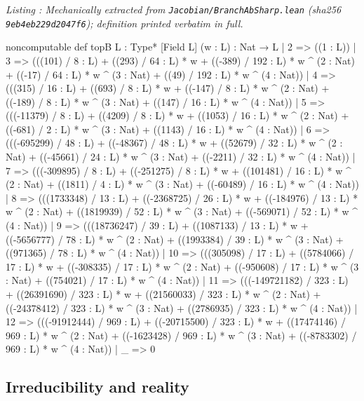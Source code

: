 \documentclass[a4paper,11pt]{article}
\newcounter{leanlisting}
\newenvironment{leanlisting}[2]{%
  \refstepcounter{leanlisting}\label{#2}%
  \begin{center}\textit{\small Listing \theleanlisting: #1}\end{center}%
  \Verbatim[breaklines=true,breakanywhere=true,fontsize=\footnotesize,frame=single,framesep=4pt,rulecolor=\color{gray!50},fillcolor=\color{gray!5}]%
}{%
  \endVerbatim%
}
\theoremstyle{plain}
\theoremstyle{definition}
\theoremstyle{remark}
\begin{document}
\begin{leanlisting}{Mechanically extracted from \texttt{Jacobian/BranchAbSharp.lean} (sha256 \texttt{9eb4eb229d2047f6}); definition printed verbatim in full.}{ab:lst:def-topb}
noncomputable def topB {L : Type*} [Field L] (w : L) : Nat → L
  | 2 => ((1 : L))
  | 3 => (((101) / 8 : L) + ((293) / 64 : L) * w + ((-389) / 192 : L) * w ^ (2 : Nat) + ((-17) / 64 : L) * w ^ (3 : Nat) + ((49) / 192 : L) * w ^ (4 : Nat))
  | 4 => (((315) / 16 : L) + ((693) / 8 : L) * w + ((-147) / 8 : L) * w ^ (2 : Nat) + ((-189) / 8 : L) * w ^ (3 : Nat) + ((147) / 16 : L) * w ^ (4 : Nat))
  | 5 => (((-11379) / 8 : L) + ((4209) / 8 : L) * w + ((1053) / 16 : L) * w ^ (2 : Nat) + ((-681) / 2 : L) * w ^ (3 : Nat) + ((1143) / 16 : L) * w ^ (4 : Nat))
  | 6 => (((-695299) / 48 : L) + ((-48367) / 48 : L) * w + ((52679) / 32 : L) * w ^ (2 : Nat) + ((-45661) / 24 : L) * w ^ (3 : Nat) + ((-2211) / 32 : L) * w ^ (4 : Nat))
  | 7 => (((-309895) / 8 : L) + ((-251275) / 8 : L) * w + ((101481) / 16 : L) * w ^ (2 : Nat) + ((1811) / 4 : L) * w ^ (3 : Nat) + ((-60489) / 16 : L) * w ^ (4 : Nat))
  | 8 => (((1733348) / 13 : L) + ((-2368725) / 26 : L) * w + ((-184976) / 13 : L) * w ^ (2 : Nat) + ((1819939) / 52 : L) * w ^ (3 : Nat) + ((-569071) / 52 : L) * w ^ (4 : Nat))
  | 9 => (((18736247) / 39 : L) + ((1087133) / 13 : L) * w + ((-5656777) / 78 : L) * w ^ (2 : Nat) + ((1993384) / 39 : L) * w ^ (3 : Nat) + ((971365) / 78 : L) * w ^ (4 : Nat))
  | 10 => (((305098) / 17 : L) + ((5784066) / 17 : L) * w + ((-308335) / 17 : L) * w ^ (2 : Nat) + ((-950608) / 17 : L) * w ^ (3 : Nat) + ((754021) / 17 : L) * w ^ (4 : Nat))
  | 11 => (((-149721182) / 323 : L) + ((26391690) / 323 : L) * w + ((21560033) / 323 : L) * w ^ (2 : Nat) + ((-24378412) / 323 : L) * w ^ (3 : Nat) + ((2786935) / 323 : L) * w ^ (4 : Nat))
  | 12 => (((-91912444) / 969 : L) + ((-20715500) / 323 : L) * w + ((17474146) / 969 : L) * w ^ (2 : Nat) + ((-1623428) / 969 : L) * w ^ (3 : Nat) + ((-8783302) / 969 : L) * w ^ (4 : Nat))
  | _ => 0
\end{leanlisting}

\subsection{Irreducibility and reality}
\end{document}

